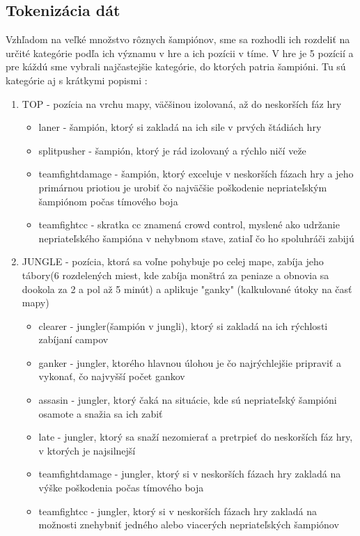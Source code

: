 \subsection{Tokenizácia dát}
Vzhľadom na veľké množstvo rôznych šampiónov, sme sa rozhodli ich rozdeliť na určité kategórie podľa ich významu v hre a ich pozícii v tíme.
V hre je 5 pozícií a pre káždú sme vybrali najčastejšie kategórie, do ktorých patria šampióni. Tu sú kategórie aj s krátkymi popismi :
\begin{enumerate}
	\item TOP - pozícia na vrchu mapy, väčšinou izolovaná, až do neskorších fáz hry
	 \begin{itemize}
		\item laner - šampión, ktorý si zakladá na ich sile v prvých štádiách hry
		\item splitpusher - šampión, ktorý je rád izolovaný a rýchlo ničí veže
		\item teamfightdamage - šampión, ktorý exceluje v neskorších fázach hry a jeho primárnou priotiou je urobiť čo najväčšie poškodenie nepriateľským šampiónom počas tímového boja
		\item teamfightcc - skratka cc znamená crowd control, myslené ako udržanie nepriateľského šampióna v nehybnom stave, zatiaľ čo ho spoluhráči zabijú
	\end{itemize}
	\item JUNGLE - pozícia, ktorá sa voľne pohybuje po celej mape, zabíja jeho tábory(6 rozdelených miest, kde zabíja monštrá za peniaze a obnovia sa dookola za 2 a pol až 5 minút)  a aplikuje "ganky" (kalkulované útoky na časť mapy)
	\begin{itemize}
		\item clearer - jungler(šampión v jungli), ktorý si zakladá na ich rýchlosti zabíjaní campov
		\item ganker - jungler, ktorého hlavnou úlohou je čo najrýchlejšie pripraviť a vykonať, čo najvyšší počet gankov
		\item assasin - jungler, ktorý čaká na situácie, kde sú nepriateľský šampióni osamote a snažia sa ich zabiť
		\item late - jungler, ktorý sa snaží nezomierať a pretrpieť do neskorších fáz hry, v ktorých je najsilnejší
		\item teamfightdamage - jungler, ktorý si v neskorších fázach hry zakladá na výške poškodenia počas tímového boja
		\item teamfightcc - jungler, ktorý si v neskorších fázach hry zakladá na možnosti znehybniť jedného alebo viacerých nepriateľských šampiónov

\end{itemize}
\end{enumerate}
